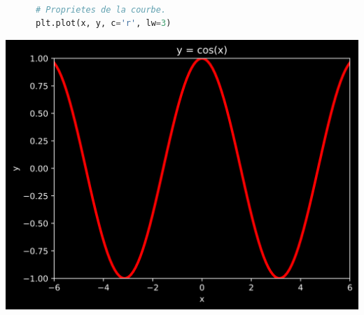 \documentclass[aspectratio=169]{beamer}
\begin{document}
\begin{frame}[fragile]{}{}
  \vfill
  \begin{minipage}{.48\textwidth}
    \begin{lstlisting}[language=Python]

      # Proprietes de la courbe.
      plt.plot(x, y, c='r', lw=3)
    \end{lstlisting}
  \end{minipage}%
  \hfill
  \begin{minipage}{.48\textwidth}
    \centering
    \includegraphics[width=\textwidth]{line_plot_color}
  \end{minipage}
  \vfill
\end{frame}

\frame{}
\end{document}
